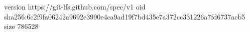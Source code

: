 version https://git-lfs.github.com/spec/v1
oid sha256:6c2f9fa06242a9692e3990e4ca9ad19f7bd435e7a372cc331226a7fd6737acb5
size 786528
